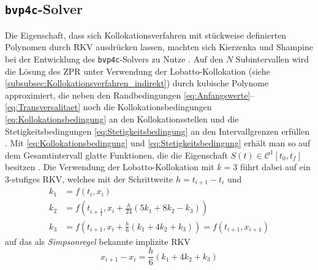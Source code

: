 \subsection{\texttt{bvp4c}-Solver}\label{subsec:bvp4c}
Die Eigenschaft, dass sich Kollokationsverfahren mit stückweise definierten Polynomen durch \gls{RKV} ausdrücken lassen, machten sich Kierzenka und Shampine bei der Entwicklung des \texttt{bvp4c}-Solvers zu Nutze \cite{Kierzenka.2001}. Auf den $N$ Subintervallen wird die Lösung des \gls{ZPR} unter Verwendung der Lobatto-Kollokation (siehe \ref{subsubsec:Kollokationsverfahren_indirekt}) durch kubische Polynome approximiert, die neben den Randbedingungen \eqref{eq:Anfangswerte}--\eqref{eq:Transversalitaet} noch die Kollokationsbedingungen \eqref{eq:Kollokationsbedingung} an den Kollokationsstellen und die Stetigkeitsbedingungen \eqref{eq:Stetigkeitsbedingung} an den Intervallgrenzen erfüllen \cite{Kierzenka.2001}. Mit \eqref{eq:Kollokationsbedingung} und \eqref{eq:Stetigkeitsbedingung} erhält man so auf dem Gesamtintervall glatte Funktionen, die die Eigenschaft $S(t) \in \mathcal{C}^1[t_0, t_f]$ besitzen \cite{Kierzenka.2001}. Die Verwendung der Lobatto-Kollokation mit $k=3$ führt dabei auf ein 3-stufiges \gls{RKV}, welches mit der Schrittweite $h=t_{i+1}-t_i$ und  
\begin{align}
	k_1 &= f(t_i,x_i) \\
	k_2 &= f(t_{i+\frac{1}{2}},x_i+\frac{h}{24}(5k_1+8k_2-k_3)) \\
	k_3 &= f(t_{i+1},x_i+\frac{h}{6}(k_1+4k_2+k_3)) = f(t_{i+1},x_{i+1})
\end{align}
auf das als \textit{Simpsonregel} bekannte implizite \gls{RKV}
\begin{equation}
	x_{i+1} - x_i = \frac{h}{6}(k_1+4k_2+k_3)
\end{equation} 
